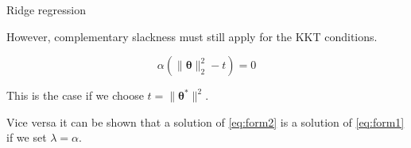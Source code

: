 \begin{vbframe}{Ridge regression}
\lz

However, complementary slackness must still apply for the KKT conditions.

$$
\alpha(\|\bm{\theta}\|^2_2 - t) = 0
$$

This is the case if we choose $t = \|\bm{\theta}^*\|^2$.

\lz

Vice versa it can be shown that a solution of \eqref{eq:form2} is a solution of \eqref{eq:form1} if we set $\lambda = \alpha$.



\framebreak


%
%
%
%
%




\end{vbframe}

\endlecture



